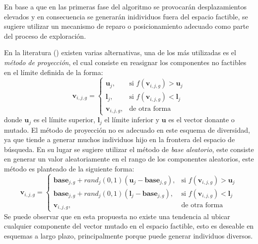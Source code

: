 En base a que en las primeras fase del algoritmo se provocarán desplazamientos elevados y en consecuencia se generarán inidividuos fuera del espacio factible, se sugiere utilizar un mecanismo de reparo o posicionamiento adecuado como parte del proceso de exploración.

%
En la literatura (\cite{kreischerevaluation}) existen varias alternativas, una de los más utilizadas es el \textit{método de proyección}, el cual consiste en reasignar los componentes no factibles en el límite definida de la forma:
\begin{equation}
   \boldsymbol{v}_{i,j,g}= 
\begin{cases}
      		\boldsymbol{u}_{j},& \text{si } f(\boldsymbol{v}_{i,j,g}) >  \boldsymbol{u}_{j} \\
      		\boldsymbol{l}_{j},& \text{si } f(\boldsymbol{v}_{i,j,g}) <  \boldsymbol{l}_{j} \\
    		\boldsymbol{v}_{i,j,g},& \text{de otra forma}
\end{cases}
\end{equation}
donde $\boldsymbol{u}_j$ es el límite superior, $\boldsymbol{l}_j$ el límite inferior y $\boldsymbol{u}$ es el vector donante o mutado.
%
El método de proyección no es adecuado en este esquema de diversidad, ya que tiende a generar muchos individuos hijo en la frontera del espacio de búsqueda.
%
En su lugar se sugiere utilizar el método de \textit{base aleatorio}, este consiste en generar un valor aleatoriamente en el rango de los componentes aleatorios, este método es planteado de la siguiente forma:
\begin{equation}
   \boldsymbol{v}_{i,j,g} = 
\begin{cases}
      		\boldsymbol{base}_{j,g} + rand_{j}(0,1)( \boldsymbol{u}_j - \boldsymbol{base}_{j,g}),& \text{si } f(\boldsymbol{v}_{i,j,g}) >  \boldsymbol{u}_{j} \\
		\boldsymbol{base}_{j,g} + rand_{j}(0,1)( \boldsymbol{l}_j - \boldsymbol{base}_{j,g}), & \text{si } f(\boldsymbol{v}_{i,j,g}) <  \boldsymbol{l}_{j} \\
    		\boldsymbol{v}_{i,j,g},& \text{de otra forma}
\end{cases}
\end{equation}
%
Se puede observar que en esta propuesta no existe una tendencia al ubicar cualquier componente del vector mutado en el espacio factible, esto es deseable en esquemas a largo plazo, principalmente porque puede generar individuos diversos.
%

